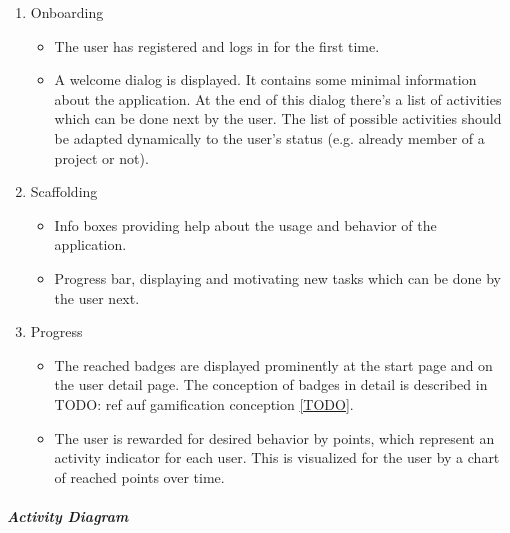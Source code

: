 \begin{enumerate}
	\vspace{-3mm}
	\setlength\itemsep{-1em}
	
	\item Onboarding
	\begin{itemize}
		\vspace{-3mm}
		\setlength\itemsep{-1em}
		
		\item The user has registered and logs in for the first time.
		\item A welcome dialog is displayed. It contains some minimal information about the application. At the end of this dialog there's a list of activities which can be done next by the user. The list of possible activities should be adapted dynamically to the user's status (e.g. already member of a project or not).
	\end{itemize}

	\item Scaffolding
	\begin{itemize}
		\vspace{-3mm}
		\setlength\itemsep{-1em}
		
		\item Info boxes providing help about the usage and behavior of the application.
		\item Progress bar, displaying and motivating new tasks which can be done by the user next.
	\end{itemize}

	\item Progress
	\begin{itemize}
		\vspace{-3mm}
		\setlength\itemsep{-1em}	
		\item The reached badges are displayed prominently at the start page and on the user detail page. The conception of badges in detail is described in TODO: ref auf gamification conception \ref{TODO}.
		\item The user is rewarded for desired behavior by points, which represent an activity indicator for each user. This is visualized for the user by a chart of reached points over time.
	\end{itemize}
\end{enumerate}
\newpage
\subparagraph{Activity Diagram}\mbox{}\\
